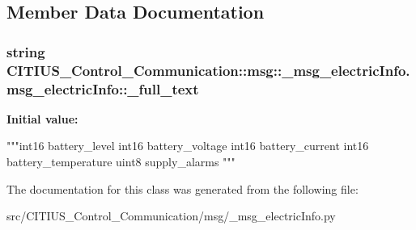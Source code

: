 \subsection{\-Member \-Data \-Documentation}
\hypertarget{class_c_i_t_i_u_s___control___communication_1_1msg_1_1__msg__electric_info_1_1msg__electric_info_a8da202c1d605ba777e739286c8691cfc}{
\subsubsection[{\-\_\-full\-\_\-text}]{\setlength{\rightskip}{0pt plus 5cm}string \-C\-I\-T\-I\-U\-S\-\_\-\-Control\-\_\-\-Communication\-::msg\-::\-\_\-msg\-\_\-electric\-Info.\-msg\-\_\-electric\-Info\-::\-\_\-full\-\_\-text}}\label{class_c_i_t_i_u_s___control___communication_1_1msg_1_1__msg__electric_info_1_1msg__electric_info_a8da202c1d605ba777e739286c8691cfc}
{\bfseries \-Initial value\-:}
\begin{DoxyCode}
"""int16 battery_level
int16 battery_voltage
int16 battery_current
int16 battery_temperature
uint8 supply_alarms
"""
\end{DoxyCode}


\-The documentation for this class was generated from the following file\-:\begin{DoxyCompactItemize}
\item 
src/\-C\-I\-T\-I\-U\-S\-\_\-\-Control\-\_\-\-Communication/msg/\-\_\-msg\-\_\-electric\-Info.\-py\end{DoxyCompactItemize}
